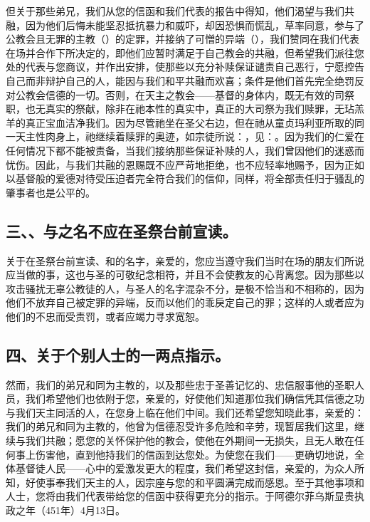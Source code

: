 但关于那些弟兄，我们从您的信函和我们代表的报告中得知，他们渴望与我们共融，因为他们后悔未能坚忍抵抗暴力和威吓，却因恐惧而慌乱，草率同意，参与了公教会且无罪的主教（）的定罪，并接纳了可憎的异端（），我们赞同在我们代表在场并合作下所决定的，即他们应暂时满足于自己教会的共融，但希望我们派往您处的代表与您商议，并作出安排，使那些以充分补赎保证谴责自己恶行，宁愿控告自己而非辩护自己的人，能因与我们和平共融而欢喜；条件是他们首先完全绝罚反对公教会信德的一切。否则，在天主之教会——基督的身体内，既无有效的司祭职，也无真实的祭献，除非在祂本性的真实中，真正的大司祭为我们赎罪，无玷羔羊的真正宝血洁净我们。因为尽管祂坐在圣父右边，但在祂从童贞玛利亚所取的同一天主性肉身上，祂继续着赎罪的奥迹，如宗徒所说：，见：。因为我们的仁爱在任何情况下都不能被责备，当我们接纳那些保证补赎的人，我们曾因他们的迷惑而忧伤。因此，与我们共融的恩赐既不应严苛地拒绝，也不应轻率地赐予，因为正如以基督般的爱德对待受压迫者完全符合我们的信仰，同样，将全部责任归于骚乱的肇事者也是公平的。\par


\subsection{三、、与之名不应在圣祭台前宣读。}

关于在圣祭台前宣读、和的名字，亲爱的，您应当遵守我们当时在场的朋友们所说应当做的事，这也与圣的可敬纪念相符，并且不会使教友的心背离您。因为那些以攻击骚扰无辜公教徒的人，与圣人的名字混杂不分，是极不恰当和不相称的，因为他们不放弃自己被定罪的异端，反而以他们的乖戾定自己的罪；这样的人或者应为他们的不忠而受责罚，或者应竭力寻求宽恕。\par


\subsection{四、关于个别人士的一两点指示。}

然而，我们的弟兄和同为主教的，以及那些忠于圣善记忆的、忠信服事他的圣职人员，我们希望他们也依附于您，亲爱的，好使他们知道那位我们确信凭其信德之功与我们天主同活的人，在您身上临在他们中间。我们还希望您知晓此事，亲爱的：我们的弟兄和同为主教的，他曾为信德忍受许多危险和辛劳，现暂居我们这里，继续与我们共融；愿您的关怀保护他的教会，使他在外期间一无损失，且无人敢在任何事上伤害他，直到他持我们的信函到达您处。为使您在我们——更确切地说，全体基督徒人民——心中的爱激发更大的程度，我们希望这封信，亲爱的，为众人所知，好使事奉我们天主的人，因宗座与您的和平圆满完成而感恩。至于其他事项和人士，您将由我们代表带给您的信函中获得更充分的指示。于阿德尔菲乌斯显贵执政之年（451年）4月13日。\par

